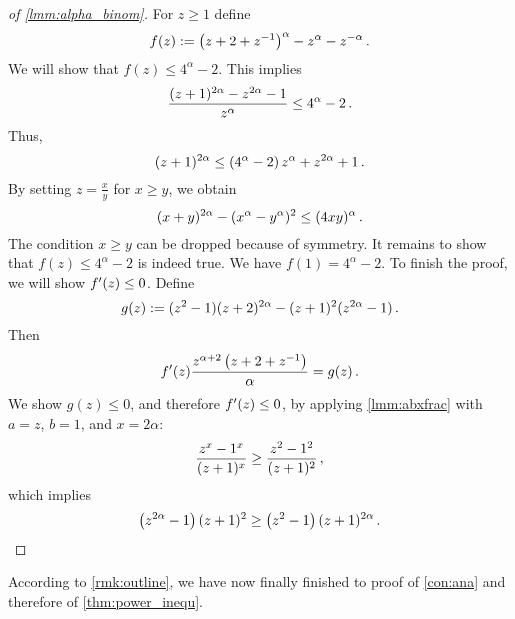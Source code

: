 %
\begin{proof}[of \autoref{lmm:alpha_binom}]
	For $z\geq1$ define
	\begin{equation*}
		f(z) := \left( z+2+z^{-1} \right)^{\alpha}-z^\alpha-z^{-\alpha}
		\, .
	\end{equation*}
	We will show that $f(z) \leq 4^\alpha-2$.
	This implies
	\begin{equation*}
		\frac{(z+1)^{2\alpha}-z^{2\alpha}-1}{z^\alpha} \leq  4^\alpha-2
		\, .
	\end{equation*}
	Thus,
	\begin{equation*}
		(z+1)^{2\alpha} \leq \left(  4^\alpha-2 \right) z^\alpha+z^{2\alpha}+1
		\, .
	\end{equation*}
	By setting $z = \frac xy$  for $x\geq y$, we obtain
	\begin{equation*}
		(x+y)^{2\alpha}-(x^\alpha-y^\alpha)^2 \leq (4xy)^\alpha
		\, .
	\end{equation*}
	The condition $x\geq y$ can be dropped because of symmetry.
	It remains to show that $f(z) \leq 4^\alpha-2$ is indeed true.
	We have $f(1) = 4^\alpha-2$. To finish the proof, we will show $f^\prime(z) \leq 0$. Define
	\begin{equation*}
		g(z) := (z^2-1)(z+2)^{2\alpha}-(z+1)^2(z^{2\alpha}-1)
		\, .
	\end{equation*}
	Then
	\begin{equation*}
		f^\prime(z) \frac{z^{\alpha+2}\left( z+2+z^{-1} \right)}{\alpha} = g(z)
		\, .
	\end{equation*}
	We show $g(z) \leq 0$, and therefore $f^\prime(z)\leq0$, by applying \autoref{lmm:abxfrac} with $a=z$, $b=1$, and $x=2\alpha$:
	\begin{equation*}
		\frac{z^{x}-1^{x}}{(z+1)^{x}} \geq \frac{z^{2}-1^{2}}{(z+1)^{2}}
		\, ,
	\end{equation*}
	which implies
	\begin{equation*}
		\left( z^{2\alpha}-1 \right)(z+1)^{2} \geq \left( z^{2}-1 \right)(z+1)^{2\alpha}
		\, .
	\end{equation*}
\end{proof}
%
According to \autoref{rmk:outline}, we have now finally finished to proof of \autoref{con:ana} and therefore of \autoref{thm:power_inequ}.
%
%
%
%
%